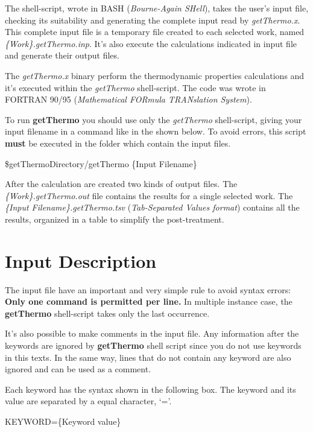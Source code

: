 \documentclass[11pt,oneside,a4paper]{article}
\begin{document}
The shell-script, wrote in BASH (\textit{Bourne-Again SHell}), takes the user's input file, checking its suitability and generating the complete input read by \textit{getThermo.x}. This complete input file is a temporary file created to each selected work, named \textit{\{Work\}.getThermo.inp}. It's also execute the calculations indicated in input file and generate their output files.

The \textit{getThermo.x} binary perform the thermodynamic properties calculations and it's executed within the \textit{getThermo} shell-script. The code was wrote in FORTRAN 90/95 (\textit{Mathematical FORmula TRANslation System}).

To run \textbf{getThermo} you should use only the \textit{getThermo} shell-script, giving your input filename in a command like in the shown below. To avoid errors, this script \textbf{must} be executed in the folder which contain the input files.
\begin{shaded}
\$getThermoDirectory/getThermo \{Input Filename\}
\end{shaded}

After the calculation are created two kinds of output files. The \textit{\{Work\}.getThermo.out} file contains the results for a single selected work. The \textit{\{Input Filename\}.getThermo.tsv} (\textit{Tab-Separated Values format}) contains all the results, organized in a table to simplify the post-treatment. 

\pagebreak
\section[Input Description]{Input Description}

The input file have an important and very simple rule to avoid syntax errors: \textbf{Only one command is permitted per line.} In multiple instance case, the \textbf{getThermo} shell-script takes only the last occurrence.

It's also possible to make comments in the input file. Any information after the keywords are ignored by \textbf{getThermo} shell script since you do not use keywords in this texts. In the same way, lines that do not contain any keyword are also ignored and can be used as a comment.

Each keyword has the syntax shown in the following box. The keyword and its value are separated by a equal character, `='.
\begin{shaded}
KEYWORD=\{Keyword value\}
\end{shaded}
\end{document}
